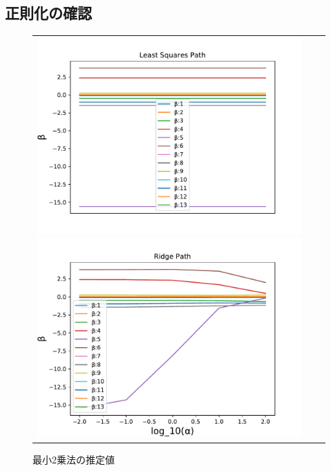\documentclass[dvipdfmx, 10pt]{beamer}
\begin{document}
\subsection{正則化の確認}
\begin{frame}{\insertsubsection}
    \begin{figure}[H]
            \begin{tabular}{ccc}
            	\begin{minipage}{0.33\hsize}
                    	\includegraphics[width=1.0\linewidth]{../img/lrPath.pdf}
                    	\caption{最小2乗法の推定値}
                   	\label{fig:lr}
            	 \end{minipage}
            	 \begin{minipage}{0.33\hsize}
                   	 \includegraphics[width=1.0\linewidth]{../img/ridgePath.pdf}

\end{minipage}
\end{tabular}
\end{figure}
\end{frame}
\end{document}
